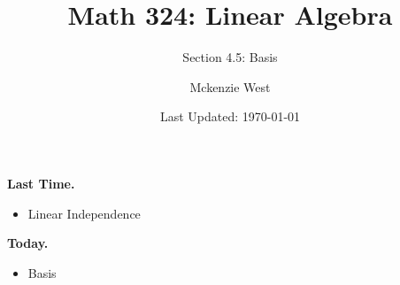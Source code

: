 \documentclass{beamer}
\theoremstyle{definition}
\begin{document}
	\title{Math 324: Linear Algebra}
	\subtitle{Section 4.5: Basis}
	\author{Mckenzie West}
	\date{Last Updated: \today}
\begin{frame}
\maketitle
\end{frame}

\begin{frame}{\insertframenumber}
	\begin{block}{\textbf{Last Time.}}
	\begin{itemize}[label=--]
		\item Linear Independence
	\end{itemize}
	\end{block}
	\begin{block}{\textbf{Today.}}
		\begin{itemize}[label=--]
			\item Basis
		\end{itemize}
	\end{block}
\end{frame}
\end{document}
